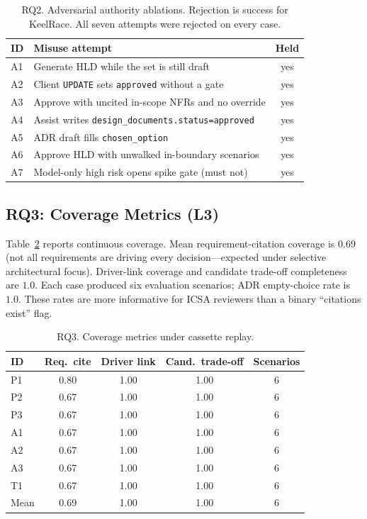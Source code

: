 \documentclass[conference]{IEEEtran}
\begin{document}
\begin{table}[!t]
\caption{RQ2. Adversarial authority ablations. Rejection is success for KeelRace. All seven attempts were rejected on every case.}
\label{tab:ablation}
\centering
\small
\begin{tabular}{@{}lp{7.2cm}c@{}}
\toprule
ID & Misuse attempt & Held \\
\midrule
A1 & Generate HLD while the set is still draft & yes \\
A2 & Client \texttt{UPDATE} sets \texttt{approved} without a gate & yes \\
A3 & Approve with uncited in-scope NFRs and no override & yes \\
A4 & Assist writes \texttt{design\_documents.status=approved} & yes \\
A5 & ADR draft fills \texttt{chosen\_option} & yes \\
A6 & Approve HLD with unwalked in-boundary scenarios & yes \\
A7 & Model-only high risk opens spike gate (must not) & yes \\
\bottomrule
\end{tabular}
\end{table}

\subsection{RQ3: Coverage Metrics (L3)}
Table~\ref{tab:coverage} reports continuous coverage.
Mean requirement-citation coverage is $0.69$ (not all requirements are driving every decision---expected under selective architectural focus).
Driver-link coverage and candidate trade-off completeness are $1.0$.
Each case produced six evaluation scenarios; ADR empty-choice rate is $1.0$.
These rates are more informative for ICSA reviewers than a binary ``citations exist'' flag.

\begin{table}[!t]
\caption{RQ3. Coverage metrics under cassette replay.}
\label{tab:coverage}
\centering
\small
\begin{tabular}{@{}lcccc@{}}
\toprule
ID & Req.\ cite & Driver link & Cand.\ trade-off & Scenarios \\
\midrule
P1 & 0.80 & 1.00 & 1.00 & 6 \\
P2 & 0.67 & 1.00 & 1.00 & 6 \\
P3 & 0.67 & 1.00 & 1.00 & 6 \\
A1 & 0.67 & 1.00 & 1.00 & 6 \\
A2 & 0.67 & 1.00 & 1.00 & 6 \\
A3 & 0.67 & 1.00 & 1.00 & 6 \\
T1 & 0.67 & 1.00 & 1.00 & 6 \\
\midrule
Mean & 0.69 & 1.00 & 1.00 & 6 \\
\bottomrule
\end{tabular}
\end{table}
\end{document}
